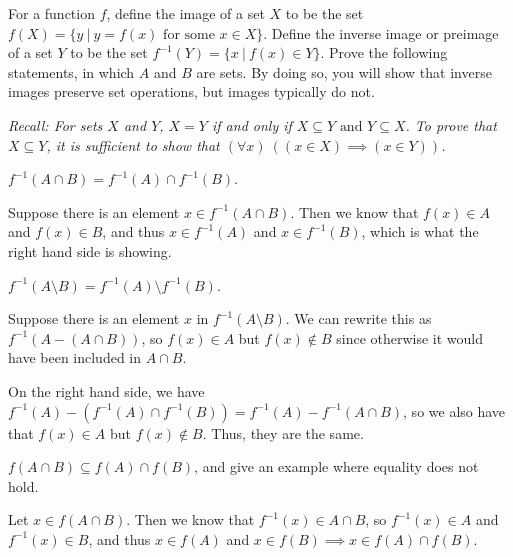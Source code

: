 \documentclass[11pt]{article}
\begin{document}
For a function $f$, define the image of a set $X$ to be the set $f(X) = \{y~|~y = f(x) \text{ for some } x \in X\}$. Define the inverse image or preimage of a set $Y$ to be the set $f^{-1}(Y) = \{x~|~f(x) \in Y\}$. Prove the following statements, in which $A$ and $B$ are sets. By doing so, you will show that inverse images preserve set operations, but images typically do not.

\textit{Recall: For sets $X$ and $Y$, $X=Y$ if and only if $X \subseteq Y \text{ and } Y \subseteq X$. To prove that $X \subseteq Y$, it is sufficient to show that $(\forall x)~((x \in X) \implies (x \in Y))$.}

\begin{Parts}
    \Part $f^{-1}(A \cap B) = f^{-1}(A) \cap f^{-1}(B)$.

    \begin{solution}
        Suppose there is an element $x \in f^{-1}(A \cap B)$. Then we know that $f(x) \in A$ and $f(x) \in B$, and thus $x \in f^{-1}(A)$ and $x \in f^{-1}(B)$, which is what the right hand side is showing.
    \end{solution}
    \Part $f^{-1}(A \setminus B) = f^{-1}(A) \setminus f^{-1}(B)$.

    \begin{solution}
        Suppose there is an element $x$ in $f^{-1}(A \setminus B)$. We can rewrite this as $f^{-1}(A - (A \cap B))$, so $f(x) \in A$ but $f(x) \notin B$ since otherwise it would have been included in $A \cap B$.

        
        On the right hand side, we have $f^{-1}(A) - (f^{-1}(A) \cap f^{-1}(B)) = f^{-1}(A) - f^{-1}(A \cap B)$, so we also have that $f(x) \in A$ but $f(x) \notin B$. Thus, they are the same. 
    \end{solution}


    \Part $f(A \cap B) \subseteq f(A) \cap f(B)$, and give an example where equality does not hold.

    \begin{solution}
        Let $x \in f(A \cap B)$. Then we know that $f^{-1}(x) \in A \cap B$, so $f^{-1}(x) \in A$ and $f^{-1}(x) \in B$, and thus $x \in f(A)$ and $x \in f(B) \implies x \in f(A)\cap f(B)$. 


\end{solution}
\end{Parts}
\end{document}
